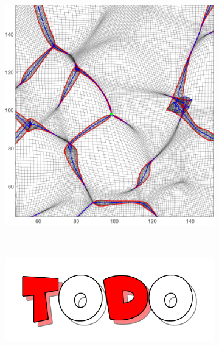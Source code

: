\documentclass[a4paper, 11pt]{article}
\begin{document}
\begin{figure}
\begin{subfigure}[b]{0.3\textwidth}
\includegraphics[width=\textwidth]{Swallowtail_Z}
\end{subfigure}~
\begin{subfigure}[b]{0.3\textwidth}
\includegraphics[width=\textwidth]{Todo}
\end{subfigure}\\
\begin{subfigure}[b]{0.3\textwidth}

\end{subfigure}
\end{figure}
\end{document}
